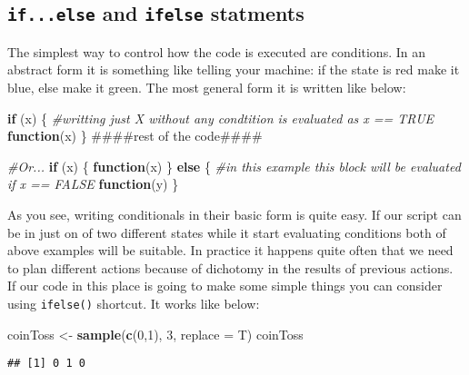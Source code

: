 \documentclass[]{book}
\newenvironment{Shaded}{\begin{snugshade}}{\end{snugshade}}
\newcommand{\KeywordTok}[1]{\textcolor[rgb]{0.13,0.29,0.53}{\textbf{#1}}}
\newcommand{\DataTypeTok}[1]{\textcolor[rgb]{0.13,0.29,0.53}{#1}}
\newcommand{\DecValTok}[1]{\textcolor[rgb]{0.00,0.00,0.81}{#1}}
\newcommand{\StringTok}[1]{\textcolor[rgb]{0.31,0.60,0.02}{#1}}
\newcommand{\CommentTok}[1]{\textcolor[rgb]{0.56,0.35,0.01}{\textit{#1}}}
\newcommand{\ControlFlowTok}[1]{\textcolor[rgb]{0.13,0.29,0.53}{\textbf{#1}}}
\newcommand{\NormalTok}[1]{#1}
\theoremstyle{definition}
\theoremstyle{definition}
\theoremstyle{definition}
\theoremstyle{remark}
\begin{document}
\subsection{\texorpdfstring{\texttt{if...else} and \texttt{ifelse}
statments}{if...else and ifelse statments}}\label{if...else-and-ifelse-statments}

The simplest way to control how the code is executed are conditions. In
an abstract form it is something like telling your machine: if the state
is red make it blue, else make it green. The most general form it is
written like below:

\begin{Shaded}
\begin{Highlighting}[]
\ControlFlowTok{if}\NormalTok{ (x) \{ }\CommentTok{#writting just X without any condtition is evaluated as x == TRUE}
  \ControlFlowTok{function}\NormalTok{(x)}
\NormalTok{\}}
\NormalTok{####rest of the code####}

\CommentTok{#Or...}
\ControlFlowTok{if}\NormalTok{ (x) \{}
  \ControlFlowTok{function}\NormalTok{(x)}
\NormalTok{\} }\ControlFlowTok{else}\NormalTok{ \{ }\CommentTok{#in this example this block will be evaluated if x == FALSE}
  \ControlFlowTok{function}\NormalTok{(y)}
\NormalTok{\}}
\end{Highlighting}
\end{Shaded}

As you see, writing conditionals in their basic form is quite easy. If
our script can be in just on of two different states while it start
evaluating conditions both of above examples will be suitable. In
practice it happens quite often that we need to plan different actions
because of dichotomy in the results of previous actions. If our code in
this place is going to make some simple things you can consider using
\texttt{ifelse()} shortcut. It works like below:

\begin{Shaded}
\begin{Highlighting}[]
\NormalTok{coinToss <-}\StringTok{ }\KeywordTok{sample}\NormalTok{(}\KeywordTok{c}\NormalTok{(}\DecValTok{0}\NormalTok{,}\DecValTok{1}\NormalTok{), }\DecValTok{3}\NormalTok{, }\DataTypeTok{replace =}\NormalTok{ T)}
\NormalTok{coinToss}
\end{Highlighting}
\end{Shaded}

\begin{verbatim}
## [1] 0 1 0
\end{verbatim}
\end{document}
